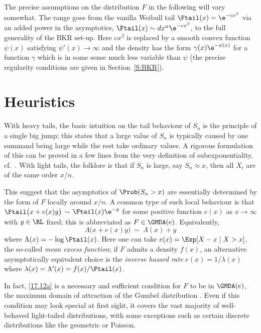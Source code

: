 The precise assumptions on the distribution $F$ in the following will vary somewhat. The range goes from the vanilla Weibull tail $\Ftail(x)=\e^{-cx^\beta}$ via an added power in the asymptotics,
$\Ftail(x)\sim dx^{\alpha}\e^{-cx^\beta}$, to the full generality of the BKR set-up. Here $cx^\beta$ is replaced by a smooth convex
function $\psi(x)$ satisfying $\psi'(x)\to\infty$ and the density has the form $\gamma(x)\e^{-\psi(x)}$ for a function $\gamma$ which
is in some sense much less variable than $\psi$ (the precise regularity conditions are given in Section~\ref{S:BKR}).

\section{Heuristics}\label{S:Heur}

With heavy tails, the basic intuition on the tail behaviour of $S_n$ is the principle of
a single big jump; this states that a large value of $S_n$ is typically caused by
one summand being large while the rest take ordinary values.
A rigorous formulation of this can be proved in a few lines from the very definition
of subexponentiality, cf.\ \cite[p.\,294]{asmussen2010ruin}. With light tails, the folklore is that if
$S_n$ is large, say $S_n\approx x$, then all $X_i$ are of the same order $x/n$.

This suggest that the asymptotics of $\Prob(S_n>x)$ are essentially determined by the
form of $F$ locally around $x/n$. A common type of such local behaviour is
that $\Ftail\bigl(x+e(x)y\bigr)$ $\sim$ $ \Ftail(x)\e^{-y}$ for some positive  function $e(x)$
as $x\to\infty$ with $y\in\RL$ fixed; this is abbreviated as $F \in \GMDA(e)$. Equivalently,
\begin{equation}\label{17.12a}
\Lambda\bigl(x+e(x)y\bigr)\ \sim\ \Lambda(x) + y
\end{equation}
where $\Lambda(x)=-\log\Ftail(x)$.
Here one can take $e(x)=\Exp[X - x \mid X > x]$, the so-called \emph{mean excess function}; if $F$ admits a density $f(x)$,   an alternative asymptotically equivalent choice is the \emph{inverse hazard rate} $e(x) = 1/\lambda(x)$ where $\lambda(x)=\Lambda'(x)=f(x)/\Ftail(x)$.

In fact, \eqref{17.12a} is a necessary and sufficient condition for $F$
to be in $\GMDA(e)$, the maximum domain of attraction of the Gumbel distribution \cite{embrechts2013modelling}. Even if this condition may look
special at first sight, it covers the vast majority of well-behaved light-tailed distributions, with
some exceptions such as certain discrete distributions like the geometric or Poisson.


